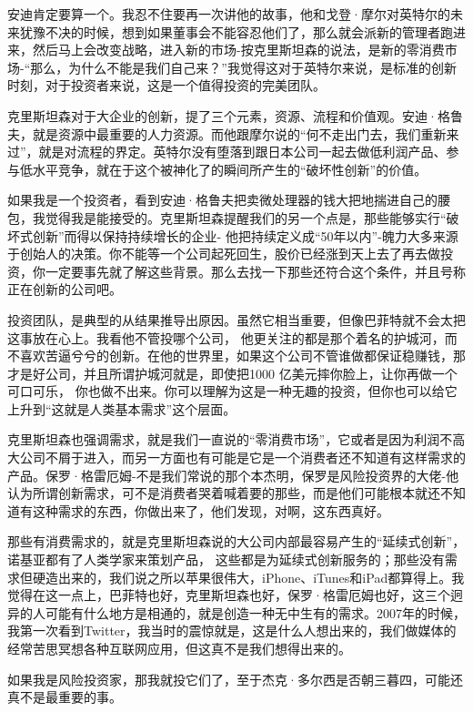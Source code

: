 安迪肯定要算一个。我忍不住要再一次讲他的故事，他和戈登·摩尔对英特尔的未来犹豫不决的时候，想到如果董事会不能容忍他们了，那么就会派新的管理者跑进来，然后马上会改变战略，进入新的市场-按克里斯坦森的说法，是新的零消费市场-``那么，为什么不能是我们自己来？''我觉得这对于英特尔来说，是标准的创新时刻，对于投资者来说，这是一个值得投资的完美团队。

克里斯坦森对于大企业的创新，提了三个元素，资源、流程和价值观。安迪·格鲁夫，就是资源中最重要的人力资源。而他跟摩尔说的``何不走出门去，我们重新来过''，就是对流程的界定。英特尔没有堕落到跟日本公司一起去做低利润产品、参与低水平竞争，就在于这个被神化了的瞬间所产生的``破坏性创新''的价值。

如果我是一个投资者，看到安迪·格鲁夫把卖微处理器的钱大把地揣进自己的腰包，我觉得我是能接受的。克里斯坦森提醒我们的另一个点是，那些能够实行``破坏式创新''而得以保持持续增长的企业-
他把持续定义成``50年以内''-魄力大多来源于创始人的决策。你不能等一个公司起死回生，股价已经涨到天上去了再去做投资，你一定要事先就了解这些背景。那么去找一下那些还符合这个条件，并且号称正在创新的公司吧。

投资团队，是典型的从结果推导出原因。虽然它相当重要，但像巴菲特就不会太把这事放在心上。我看他不管投哪个公司，
他更关注的都是那个着名的护城河，而不喜欢苦逼兮兮的创新。在他的世界里，如果这个公司不管谁做都保证稳赚钱，那才是好公司，并且所谓护城河就是，即使把1000
亿美元摔你脸上，让你再做一个可口可乐，
你也做不出来。你可以理解为这是一种无趣的投资，但你也可以给它上升到``这就是人类基本需求''这个层面。

克里斯坦森也强调需求，就是我们一直说的``零消费市场''，它或者是因为利润不高大公司不屑于进入，而另一方面也有可能是它是一个消费者还不知道有这样需求的产品。保罗·格雷厄姆-不是我们常说的那个本杰明，保罗是风险投资界的大佬-他认为所谓创新需求，可不是消费者哭着喊着要的那些，而是他们可能根本就还不知道有这种需求的东西，你做出来了，他们发现，对啊，这东西真好。

那些有消费需求的，就是克里斯坦森说的大公司内部最容易产生的``延续式创新''，诺基亚都有了人类学家来策划产品，
这些都是为延续式创新服务的；那些没有需求但硬造出来的，我们说之所以苹果很伟大，iPhone、iTunes和iPad都算得上。我觉得在这一点上，巴菲特也好，克里斯坦森也好，保罗·格雷厄姆也好，这三个迥异的人可能有什么地方是相通的，就是创造一种无中生有的需求。2007年的时候，我第一次看到Twitter，我当时的震惊就是，这是什么人想出来的，我们做媒体的经常苦思冥想各种互联网应用，但这真不是我们想得出来的。

如果我是风险投资家，那我就投它们了，至于杰克·多尔西是否朝三暮四，可能还真不是最重要的事。

